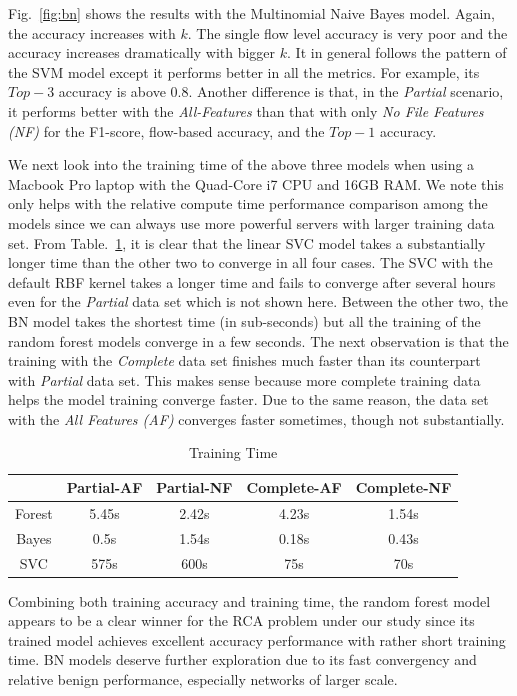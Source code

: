 Fig.~\ref{fig:bn} shows the results with the Multinomial Naive Bayes model. Again, the accuracy increases with $k$. The single flow level accuracy is very poor and the accuracy increases dramatically with bigger $k$. 
It in general follows the pattern of the SVM model except it performs better in all the metrics. For example, its $Top-3$ accuracy is above $0.8$. Another difference is that, in the {\it Partial} scenario, it performs better with the {\it All-Features} than that with only {\it No File Features (NF) } for the F1-score, flow-based accuracy, and the $Top-1$ accuracy.

We next look into the training time of the above three models when using a Macbook Pro laptop with the Quad-Core i7 CPU and 16GB RAM. We note this only helps with the relative compute time performance comparison among the models since we can always use more powerful servers with larger training data set. From Table.~\ref{tab:time}, it is clear that the linear SVC model takes a substantially longer time than the other two to converge in all four cases. The SVC with the default RBF kernel takes a longer time and fails to converge after several hours even for the {\it Partial} data set which is not shown here. Between the other two, the BN model takes the shortest time (in sub-seconds) but all the training of the random forest models converge in a few seconds. The next observation is that the training with the {\it Complete} data set finishes much faster than its counterpart with {\it Partial} data set. This makes sense because more complete training data helps the model training converge faster. Due to the same reason, the data set with the {\it All Features (AF)} converges faster sometimes, though not substantially.

\begin{table}[!ht]
\caption{Training Time }
\label{tab:time}
\begin{center}
\begin{tabular}{ |c|c|c|c|c| } 
 \hline
  & Partial-AF & Partial-NF & Complete-AF & Complete-NF\\ 
 \hline
 Forest & 5.45s & 2.42s & 4.23s & 1.54s\\ 
 \hline
 Bayes & 0.5s & 1.54s & 0.18s & 0.43s\\
 \hline
 SVC & 575s & 600s & 75s &70s\\ 
 \hline
\end{tabular}
\end{center}
\end{table}
Combining both training accuracy and training time, the random forest model appears to be a clear winner for the RCA problem under our study since its trained model achieves excellent accuracy performance with rather short training time. BN models deserve further exploration due to its fast convergency and relative benign performance, especially networks of larger scale.

